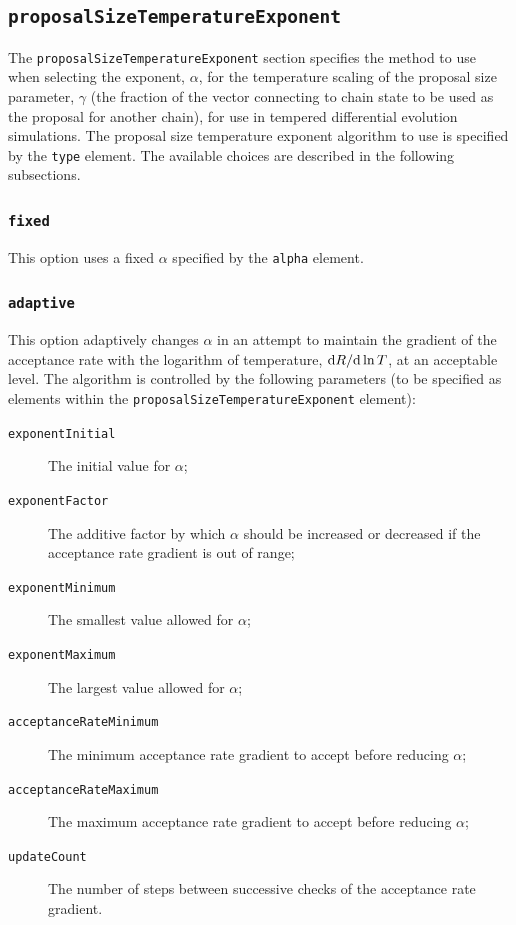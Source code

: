 \subsection{{\tt proposalSizeTemperatureExponent}}

The {\tt proposalSizeTemperatureExponent} section specifies the method to use when selecting the exponent, $\alpha$, for the temperature scaling of the proposal size parameter, $\gamma$ (the fraction of the vector connecting to chain state to be used as the proposal for another chain), for use in tempered differential evolution simulations. The proposal size temperature exponent algorithm to use is specified by the {\tt type} element. The available choices are described in the following subsections.

\subsubsection{{\tt fixed}}

This option uses a fixed $\alpha$ specified by the {\tt alpha} element.

\subsubsection{{\tt adaptive}}

This option adaptively changes $\alpha$ in an attempt to maintain the gradient of the acceptance rate with the logarithm of temperature, ${\rm d} R/{\rm d}\ln T$, at an acceptable level. The algorithm is controlled by the following parameters (to be specified as elements within the {\tt proposalSizeTemperatureExponent} element):
\begin{description}
\item[{\tt exponentInitial}] The initial value for $\alpha$;
\item[{\tt exponentFactor}] The additive factor by which $\alpha$ should be increased or decreased if the acceptance rate gradient is out of range;
\item[{\tt exponentMinimum}] The smallest value allowed for $\alpha$;
\item[{\tt exponentMaximum}] The largest value allowed for $\alpha$;
\item[{\tt acceptanceRateMinimum}] The minimum acceptance rate gradient to accept before reducing $\alpha$;
\item[{\tt acceptanceRateMaximum}] The maximum acceptance rate gradient to accept before reducing $\alpha$;
\item[{\tt updateCount}] The number of steps between successive checks of the acceptance rate gradient.
\end{description}


